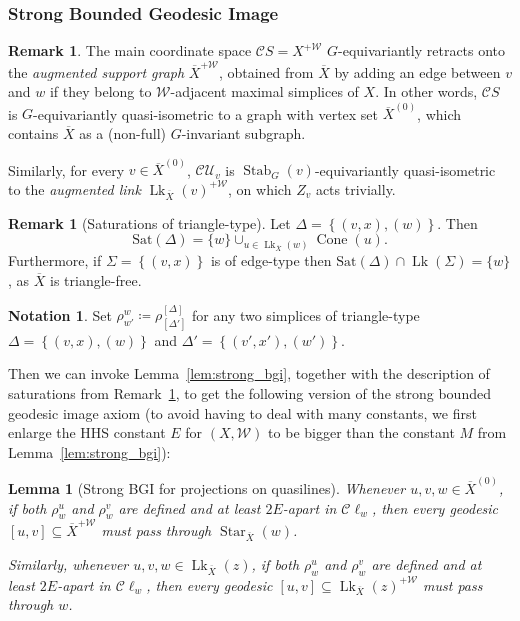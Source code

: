 \documentclass[svgnames]{amsart}
\theoremstyle{plain}
\newtheorem{lemma}[thm]{Lemma}
\theoremstyle{definition}
\newtheorem{rem}[thm]{Remark}
\newtheorem{notation}[thm]{Notation}
\newcommand{\C}{\mathcal C}
\newcommand{\ov}[1]{\overline{#1}}
\newcommand{\U}{\mathcal{U}}
\newcommand{\link}{\operatorname{Lk}}
\newcommand{\Stab}[2]{\operatorname{Stab}_{#1}(#2)}
\newcommand{\Sat}{\mathrm{Sat}}
\newcommand{\W}{\mathcal{W}}
\newcommand{\Squid}{\operatorname{Cone}}
\begin{document}
\subsubsection{Strong Bounded Geodesic Image}
\begin{rem}\label{rem:coord_spaces_wrt_lines}
 The main coordinate space $\C S=X^{+\W}$ $G$-equivariantly retracts onto the \emph{augmented support graph} $\ov X^{+\W}$, obtained from $\ov{X}$ by adding an edge between $v$ and $w$ if they belong to $\W$-adjacent maximal simplices of $X$. In other words, $\C S$ is $G$-equivariantly quasi-isometric to a graph with vertex set $\ov X^{(0)}$, which contains $\ov X$ as a (non-full) $G$-invariant subgraph.
 
Similarly, for every $v\in \ov{X}^{(0)}$, $\C \U_v$ is $\Stab{G}{v}$-equivariantly quasi-isometric to the \emph{augmented link} $\link_{\ov{X}}(v)^{+\W}$, on which $Z_v$ acts trivially.
  \end{rem}

\begin{rem}[Saturations of triangle-type] \label{rem:saturation_in_Short}
Let $\Delta=\left\{(v,x), (w)\right\}$. Then $$\Sat(\Delta)=\{w\}\cup_{u\in\link_{\ov{X}}(w)}\Squid(u).$$ 
Furthermore, if $\Sigma=\left\{(v,x)\right\}$ is of edge-type then $\Sat(\Delta)\cap \link(\Sigma)=\{w\}$, as $\ov{X}$ is triangle-free.
\end{rem}

\begin{notation}\label{notation:rho}
    Set $\rho^w_{w'}\coloneq \rho^{[\Delta]}_{[\Delta']}$ for any two simplices of triangle-type $\Delta=\left\{(v,x), (w)\right\}$ and $\Delta'=\left\{(v',x'), (w')\right\}$. 
\end{notation}
Then we can invoke Lemma~\ref{lem:strong_bgi}, together with the description of saturations from Remark~\ref{rem:saturation_in_Short}, to get the following version of the strong bounded geodesic image axiom (to avoid having to deal with many constants, we first enlarge the HHS constant $E$ for $(X,\W)$ to be bigger than the constant $M$ from Lemma~\ref{lem:strong_bgi}):

\begin{lemma}[Strong BGI for projections on quasilines]\label{lem:strong_bgi_for_short}
    Whenever $u,v,w\in \ov X^{(0)}$, if both $\rho^u_w$ and $\rho^v_w$ are defined and at least $2E$-apart in $\C \ell_w$, then every geodesic $[u,v]\subseteq \ov X^{+\W}$ must pass through $\operatorname{Star}_{\ov{X}}(w)$.

    Similarly, whenever $u,v,w\in\link_{\ov{X}}(z)$, if both $\rho^u_w$ and $\rho^v_w$ are defined and at least $2E$-apart in $\C\ell_w$, then every geodesic $[u,v]\subseteq \link_{\ov{X}}(z)^{+\W}$ must pass through $w$.
\end{lemma}
\end{document}
